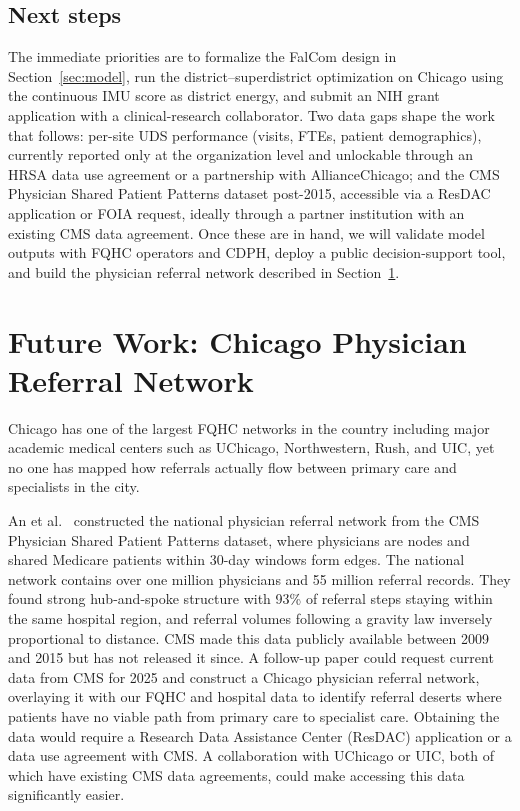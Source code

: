 \documentclass[11pt]{article}
\begin{document}
\subsection*{Next steps}

The immediate priorities are to formalize the FalCom design in Section~\ref{sec:model}, run the district--superdistrict optimization on Chicago using the continuous IMU score as district energy, and submit an NIH grant application with a clinical-research collaborator. Two data gaps shape the work that follows: per-site UDS performance (visits, FTEs, patient demographics), currently reported only at the organization level and unlockable through an HRSA data use agreement or a partnership with AllianceChicago; and the CMS Physician Shared Patient Patterns dataset post-2015, accessible via a ResDAC application or FOIA request, ideally through a partner institution with an existing CMS data agreement. Once these are in hand, we will validate model outputs with FQHC operators and CDPH, deploy a public decision-support tool, and build the physician referral network described in Section~\ref{sec:future}.


\section{Future Work: Chicago Physician Referral Network}\label{sec:future}

Chicago has one of the largest FQHC networks in the
country including major academic medical centers such
as UChicago, Northwestern, Rush, and UIC, yet no one
has mapped how referrals actually flow between primary
care and specialists in the city.

An et al.~\cite{an2018analysis, an2018referral}
constructed the national physician referral network
from the CMS Physician Shared Patient Patterns
dataset, where physicians are nodes and shared
Medicare patients within 30-day windows form edges.
The national network contains over one million
physicians and 55 million referral records. They
found strong hub-and-spoke structure with 93\% of
referral steps staying within the same hospital
region, and referral volumes following a gravity
law inversely proportional to distance. CMS made
this data publicly available between 2009 and 2015
but has not released it since. A follow-up
paper could request current data from CMS for 2025
and construct a Chicago physician referral network,
overlaying it with our FQHC and hospital data to
identify referral deserts where patients have no
viable path from primary care to specialist care.
Obtaining the data would require a Research Data
Assistance Center
(ResDAC) application or a data use agreement
with CMS. A collaboration with
UChicago or UIC, both of which have existing CMS
data agreements, could make accessing this data
significantly easier.
\end{document}
